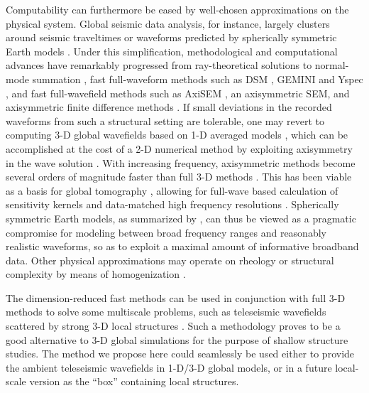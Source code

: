 \documentclass[extra]{gji}
\begin{document}
Computability can furthermore be eased by well-chosen approximations 
on the physical system. 
Global seismic data analysis, for instance, largely clusters around seismic traveltimes 
or waveforms predicted by spherically symmetric Earth models \cite[]{rawlinson2010seismic,
driel2015instaseis}.
Under this simplification, methodological and computational advances have remarkably progressed 
from ray-theoretical solutions \cite[]{jeffreys1958seismological} 
to normal-mode summation \cite[e.g., Chap 8,][]{dahlen1998theoretical},
fast full-waveform methods such as
DSM \cite[]{kawai2006complete}, GEMINI \cite[]{friederich1995complete} and 
Yspec \cite[]{al2008calculation}, 
and fast full-wavefield methods such as AxiSEM \cite[]{nissen2014axisem}, an axisymmetric SEM, and 
axisymmetric finite difference methods \cite[]{igel1995sh, toyokuni2006fdm}. 
If small deviations in the recorded waveforms from such a structural setting
are tolerable, one may revert to computing 3-D global wavefields based on
1-D averaged models \cite[e.g. PREM,][]{dziewonski1981prem}, 
which can be accomplished at the cost of a 2-D
numerical method by exploiting axisymmetry in the wave solution
\cite[]{nissen2007axisem}. 
With increasing frequency, axisymmetric methods become 
several orders of magnitude faster than full 3-D methods \cite[]{nissen2014axisem}. 
This has been viable as a basis for global tomography 
\cite[]{rawlinson2010seismic}, allowing for full-wave based calculation 
of sensitivity kernels \cite[]{colombi2012kernels} and data-matched 
high frequency resolutions \cite[e.g. 1Hz,][]{hosseini2015multifrequency}. 
Spherically symmetric Earth models, as summarized by \cite{nissen2014axisem},
can thus be viewed as a pragmatic compromise for modeling between broad
frequency ranges and reasonably realistic waveforms, so as to exploit 
a maximal amount of informative broadband data.
Other physical approximations may operate on rheology 
\cite[e.g., acoustic approximation, ][]{zhu2009elastic}
or structural complexity by means of homogenization \cite[]{capdeville2013residual}.

The dimension-reduced fast methods can be used in conjunction with
full 3-D methods to solve some multiscale problems, such as teleseismic 
wavefields scattered by strong 3-D local structures
\cite[e.g., ][]{masson2013numerical, monteiller2015three}. Such a methodology
proves to be a good alternative to 3-D global simulations for the purpose of shallow
structure studies. The method we propose here could seamlessly be used either to 
provide the ambient teleseismic wavefields in 1-D/3-D global models, or in a 
future local-scale version as the ``box'' containing local structures. 
\end{document}
